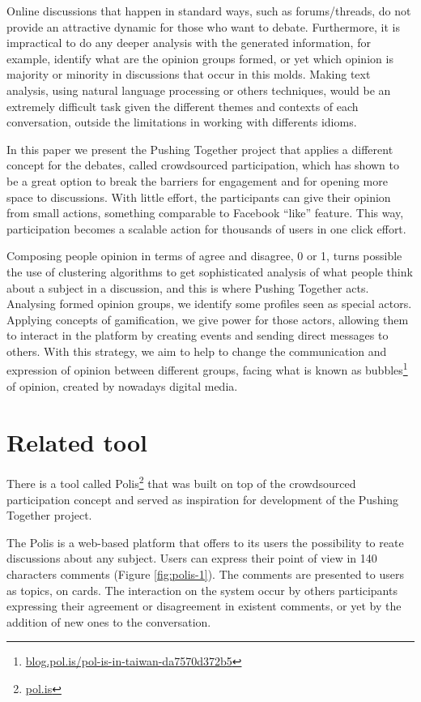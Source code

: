 \documentclass{llncs}
\begin{document}
  Online discussions that happen in standard ways, such as forums/threads, do
not provide an attractive dynamic for those who want to debate. Furthermore, it
is impractical to do any deeper analysis with the generated information, for
example, identify what are the opinion groups formed, or yet which opinion is
majority or minority in discussions that occur in this molds. Making text
analysis, using natural language processing or others techniques, would be an
extremely difficult task given the different themes and contexts of each
conversation, outside the limitations in working with differents idioms.

  In this paper we present the Pushing Together project that applies a
different concept for the debates, called crowdsourced participation, which has
shown to be a great option to break the barriers for engagement and for opening
more space to discussions. With little effort, the participants can give their
opinion from small actions, something comparable to Facebook ``like'' feature.
This way, participation becomes a scalable action for thousands of users in one
click effort.

  Composing people opinion in terms of agree and disagree, 0 or 1, turns
possible the use of clustering algorithms to get sophisticated analysis of what
people think about a subject in a discussion, and this is where Pushing
Together acts.  Analysing formed opinion groups, we identify some profiles seen
as special actors.  Applying concepts of gamification, we give power for those
actors, allowing them to interact in the platform by creating events and
sending direct messages to others. With this strategy, we aim to help to change
the communication and expression of opinion between different groups, facing
what is known as
bubbles\footnote{\url{blog.pol.is/pol-is-in-taiwan-da7570d372b5}} of opinion,
created by nowadays digital media.

\section{Related tool}

  There is a tool called Polis\footnote{\url{pol.is}} that was built on top of
the crowdsourced participation concept and served as inspiration for
development of the Pushing Together project.

  The Polis is a web-based platform that offers to its users the possibility to
reate discussions about any subject. Users can express their point of view in
140 characters comments (Figure \ref{fig:polis-1}). The comments are presented
to users as topics, on cards. The interaction on the system occur by others
participants expressing their agreement or disagreement in existent comments,
or yet by the addition of new ones to the conversation. 
\end{document}
